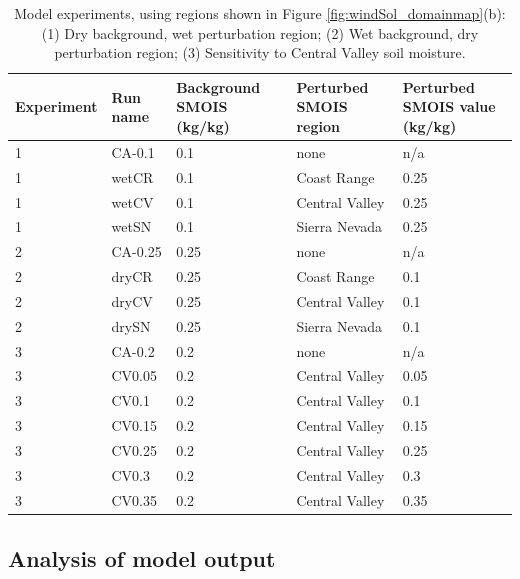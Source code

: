 \begin{table}
\begin{tabular}{p{2.5cm} l p{3cm} p{3cm} p{3.5cm}}
\hline
Experiment & Run name & Background SMOIS (kg/kg) & Perturbed SMOIS region & Perturbed SMOIS value (kg/kg) \\
\hline
1 & CA-0.1 & 0.1 & none & n/a \\
1 & wetCR & 0.1 & Coast Range & 0.25 \\
1 & wetCV & 0.1 & Central Valley & 0.25 \\
1 & wetSN & 0.1 & Sierra Nevada & 0.25 \\
2 & CA-0.25 & 0.25 & none & n/a \\
2 & dryCR & 0.25 & Coast Range & 0.1 \\
2 & dryCV & 0.25 & Central Valley & 0.1 \\
2 & drySN & 0.25 & Sierra Nevada & 0.1 \\
3 & CA-0.2 & 0.2 & none & n/a \\
3 & CV0.05 & 0.2 & Central Valley & 0.05 \\
3 & CV0.1 & 0.2 & Central Valley & 0.1 \\
3 & CV0.15 & 0.2 & Central Valley & 0.15 \\
3 & CV0.25 & 0.2 & Central Valley & 0.25 \\
3 & CV0.3 & 0.2 & Central Valley & 0.3 \\
3 & CV0.35 & 0.2 & Central Valley & 0.35 \\
\hline
\end{tabular}
\caption{Model experiments, using regions shown in Figure \ref{fig:windSol_domainmap}(b): (1) Dry background, wet perturbation region; (2) Wet background, dry perturbation region; (3) Sensitivity to Central Valley soil moisture.}
\label{table:windSol_runlist}
\end{table}

\subsection{Analysis of model output}
\label{subsec:methods_model_output}

